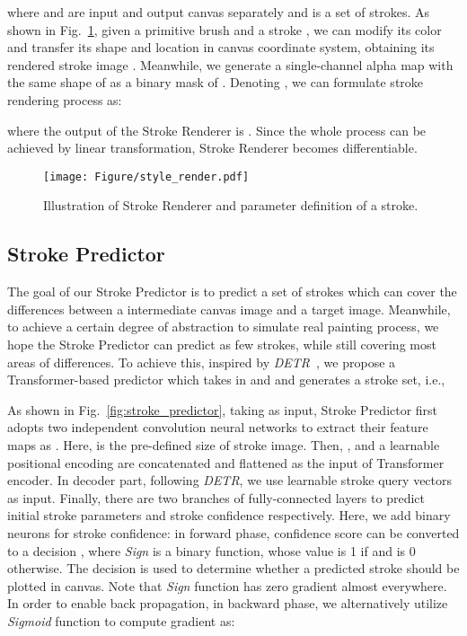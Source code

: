 \documentclass[10pt,twocolumn,letterpaper]{article}
\begin{document}
where  and  are input and output canvas separately and  is a set of  strokes.
As shown in Fig.~\ref{fig:style_render}, given a primitive brush  and a stroke , we can modify its color and transfer its shape and location in canvas coordinate system, obtaining its rendered stroke image . 
Meanwhile, we generate a single-channel alpha map  with the same shape of  as a binary mask of .
Denoting , we can formulate stroke rendering process as:


where the output of the Stroke Renderer is .
Since the whole process can be achieved by linear transformation, Stroke Renderer becomes differentiable.











\begin{figure}[t]
\begin{center}
\texttt{[image: Figure/style\_render.pdf]}
\end{center}
   \caption{Illustration of Stroke Renderer and parameter definition of a stroke.}
\label{fig:style_render}
\vspace{-0.4cm}
\end{figure}


\subsection{Stroke Predictor}
The goal of our Stroke Predictor is to predict a set of strokes which can cover the differences between a intermediate canvas image and a target image.
Meanwhile, to achieve a certain degree of abstraction to simulate real painting process, we hope the Stroke Predictor can predict as few strokes, while still covering most areas of differences. 
To achieve this, inspired by \textit{DETR}~\cite{carion2020endtoend}, we propose a Transformer-based predictor which takes in  and  and generates a stroke set, i.e.,




As shown in Fig.~\ref{fig:stroke_predictor}, taking  as input, Stroke Predictor first adopts two independent convolution neural networks to extract their feature maps as .
Here,  is the pre-defined size of stroke image. Then, ,  and a learnable positional encoding are concatenated and flattened as the input of Transformer encoder. 
In decoder part, following \textit{DETR}, we use  learnable stroke query vectors as input.
Finally, there are two branches of fully-connected layers to predict initial stroke parameters  and stroke confidence  respectively. 
Here, we add binary neurons for stroke confidence: in forward phase, confidence score  can be converted to a decision ,
where \textit{Sign} is a binary function, whose value is 1 if  and is 0 otherwise.
The decision  is used to determine whether a predicted stroke should be plotted in canvas. 
Note that \textit{Sign} function has zero gradient almost everywhere. In order to enable back propagation, in backward phase, we alternatively utilize \textit{Sigmoid} function  to compute gradient as:
\end{document}
